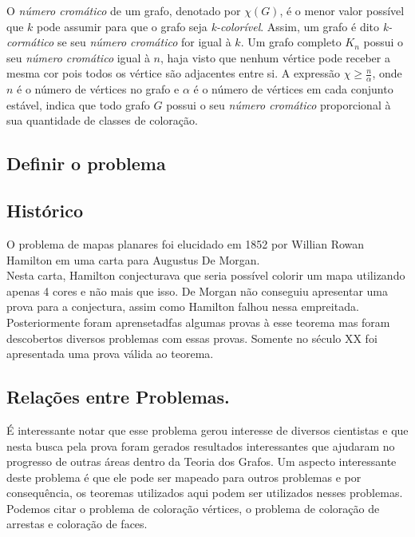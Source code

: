 \documentclass[12pt]{article}
\begin{document}
O \emph{número cromático} de um grafo, denotado por $\chi(G)$, é o menor valor possível que $k$ pode assumir para que o grafo seja \emph{k-colorível}. Assim, um grafo é dito \emph{k-cormático} se seu \emph{número cromático} for igual à $k$. Um grafo completo $K_n$ possui o seu \emph{número cromático} igual à $n$, haja visto que nenhum vértice pode receber a mesma cor pois todos os vértice são adjacentes entre si. A expressão
$\chi \geq \frac{n}{\alpha}$, onde $n$ é o número de vértices no grafo e $\alpha$ é o número de vértices em cada conjunto estável, indica que todo grafo $G$ possui o seu \emph{número cromático} proporcional à sua quantidade de classes de coloração.

\subsection{Definir o problema}

\subsection{Histórico}


O problema de mapas planares foi elucidado em 1852 por Willian Rowan Hamilton em uma carta para Augustus De Morgan.\\
Nesta carta, Hamilton conjecturava que seria possível colorir um mapa utilizando apenas 4 cores e não mais que isso. De Morgan não conseguiu apresentar uma prova para a conjectura, assim como Hamilton falhou nessa empreitada. Posteriormente foram aprensetadfas algumas provas à esse teorema mas foram descobertos diversos problemas com essas provas. Somente no século XX foi apresentada uma prova válida ao teorema.\\


\subsection{Relações entre Problemas.}

É interessante notar que esse problema gerou interesse de diversos cientistas e que nesta busca pela prova foram gerados resultados interessantes que ajudaram no progresso de outras áreas dentro da Teoria dos Grafos. Um aspecto interessante deste problema é que ele pode ser mapeado para outros problemas e por consequência, os teoremas utilizados aqui podem ser utilizados nesses problemas. Podemos citar o problema de coloração vértices, o problema de coloração de arrestas e coloração de faces.
\end{document}
